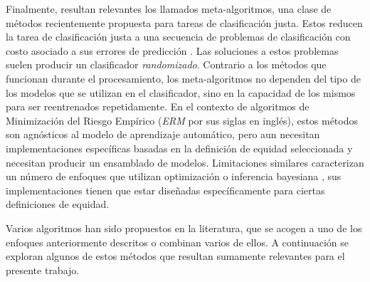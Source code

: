 Finalmente, resultan relevantes los llamados meta-algoritmos, una clase de métodos recientemente propuesta para tareas de clasificación justa.
Estos reducen la tarea de clasificación justa a una secuencia de problemas de clasificación con costo asociado a sus errores de predicción \parencite{agarwal2018reductions, agarwal2019fair, kearns2018preventing}.
Las soluciones a estos problemas suelen producir un clasificador \emph{randomizado}. Contrario a los métodos que funcionan durante el procesamiento, los meta-algoritmos no dependen del tipo de los modelos que se utilizan en el clasificador, sino en la capacidad de los mismos para ser reentrenados repetidamente.
En el contexto de algoritmos de Minimización del Riesgo Empírico (\emph{ERM} por sus siglas en inglés), estos métodos son agnósticos al modelo de aprendizaje automático, pero aun necesitan implementaciones específicas basadas en la definición de equidad seleccionada y necesitan producir un ensamblado de modelos. Limitaciones similares caracterizan un número de enfoques que utilizan optimización \parencite{chiappa2018causal,Dimitrakakis_Liu_Parkes_Radanovic_2019} o inferencia bayesiana \parencite{kearns2018preventing,thomas2019preventing}, sus implementaciones tienen que estar diseñadas específicamente para ciertas definiciones de equidad.

Varios algoritmos han sido propuestos en la literatura, que se acogen a uno de los enfoques anteriormente descritos o combinan varios de ellos.
A continuación se exploran algunos de estos métodos que resultan sumamente relevantes para el presente trabajo.

